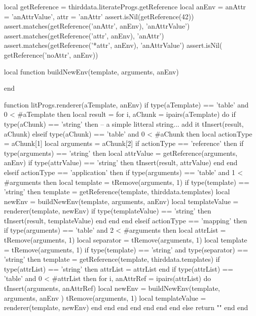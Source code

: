 {{\startLuaTest
local getReference = thirddata.literateProgs.getReference
local anEnv = { 
  anAttr = 'anAttrValue',
  attr   = 'anAttr'
}
assert.isNil(getReference(42))
assert.matches(getReference('anAttr', anEnv), 'anAttrValue')
assert.matches(getReference('attr',   anEnv), 'anAttr')
assert.matches(getReference('*attr',  anEnv), 'anAttrValue')
assert.isNil(  getReference('noAttr', anEnv))
\stopLuaTest
\stopTestCase

\startLuaCode
local function buildNewEnv(template, arguments, anEnv)

end

function litProgs.renderer(aTemplate, anEnv)
  if type(aTemplate) == 'table' and 0 < #aTemplate then
    local result = { }
    for i, aChunk = ipairs(aTemplate) do
      if type(aChunk) == 'string' then
        -- a simple litteral string... add it
        tInsert(result, aChunk)
      elseif type(aChunk) == 'table' and 0 < #aChunk then
        local actionType = aChunk[1]
        local arguments  = aChunk[2]
        if actionType == 'reference' then
          if type(arguments) == 'string' then
            local attrValue = getReference(arguments, anEnv)
            if type(attrValue) == 'string' then
              tInsert(result, attrValue)
            end
          end
        elseif actionType == 'application' then
          if type(arguments) == 'table' and 1 < #arguments then
            local template = tRemove(arguments, 1)
            if type(template) == 'string' then
              template = getReference(template, thirddata.templates)
              local newEnv = buildNewEnv(template, arguments, anEnv)
              local templateValue = renderer(template, newEnv)
              if type(templateValue) == 'string' then
                tInsert(result, templateValue)
              end
            end
          end
        elseif actionType == 'mapping' then
          if type(arguments) == 'table' and 2 < #arguments then
            local attrList  = tRemove(arguments, 1)
            local separator = tRemove(arguments, 1)
            local template  = tRemove(arguments, 1)
            if type(template) == 'string' and type(separator) == 'string' then
              template = getReference(template, thirddata.templates)
              if type(attrList) == 'string' then
                attrList = { attrList }
              end
              if type(attrList) == 'table' and 0 < #attrList then
                for i, anAttrRef = ipairs(attrList) do
                  tInsert(arguments, anAttrRef)
                  local newEnv = buildNewEnv(template, arguments, anEnv )
                  tRemove(arguments, 1)
                  local templateValue = renderer(template, newEnv)
                end
              end
            end
          end
        end
      end
    end
  else
    return ""
  end
end
\stopLuaCode

}}
